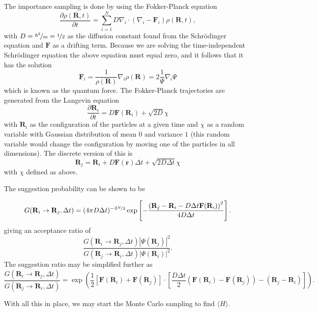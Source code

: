 \documentclass[aps,prb,twocolumn,floatfix]{revtex4}
\renewcommand{\vec}{\mathbf}
\begin{document}
The importance sampling is done by using the Fokker-Planck equation %
\begin{equation}
    \frac{\partial \rho (\vec R, t)}{\partial t} = \sum_{i=1}^{N} D \nabla_i \cdot (\nabla_i - \vec F_i) \rho(\vec R, t),
\end{equation}
with $D = \nicefrac{\hbar^2}{m} = \nicefrac{1}{2}$ as the diffusion constant found from the Schrödinger equation and $\vec F$ as a drifting term. Because we are solving the time-independent Schrödinger equation the above equation must equal zero, and it follows that it has the solution\cite{lecturenotes}
\begin{equation}
    \vec F_i = \frac{1}{\rho (\vec R)}\nabla_i \rho(\vec R) = 2\frac{1}{\Psi} \nabla_i \Psi
\end{equation}
which is known as the quantum force. The Fokker-Planck trajectories are generated from the Langevin equation
\begin{equation}
    \frac{\partial \vec R_i}{\partial t} = D\vec F(\vec R_i) + \sqrt{2D}\chi
\end{equation}
with $\vec R_i$ as the configuration of the particles at a given time and $\chi$ as a random variable with Gaussian distribution of mean 0 and variance $1$ (this random variable would change the configuration by moving one of the particles in all dimensions). The discrete version of this is
\begin{equation}
    \vec R_j = \vec R_i + D \vec F(\vec r) \Delta t + \sqrt{2D\Delta t} \chi
\end{equation}
with $\chi$ defined as above.

The suggestion probability can be shown to be
\begin{widetext}
    \begin{equation}
        G(\vec R_i \to \vec R_j, \Delta t) = (4\pi D \Delta t)^{-3 \nicefrac{N}{2}} \exp \left[ - \frac{\left(\vec R_j - \vec R_i - D \Delta t \vec F(\vec R_i) \right)^2}{4 D \Delta t} \right].
    \end{equation}
giving an acceptance ratio of
\begin{equation}
    \frac{G(\vec R_i \to \vec R_j, \Delta t) |\Psi(\vec R_j)|^2}{G(\vec R_j \to \vec R_i, \Delta t) |\Psi(\vec R_i)|^2}.
\end{equation}
The suggestion ratio may be simplified further as
\begin{equation}
    \frac{G(\vec R_i \to \vec R_j, \Delta t)}{G(\vec R_j \to \vec R_i, \Delta t)} = \exp \left ( \frac{1}{2} \left[ \vec F(\vec R_i) + \vec F(\vec R_j) \right] \cdot
    \left[ \frac{D \Delta t}{2} \left ( \vec F (\vec R_i) - \vec F( \vec R_j) \right) - (\vec R_j - \vec R_i) \right] \right).
\end{equation} 
\end{widetext}
With all this in place, we may start the Monte Carlo sampling to find $\langle H \rangle$.
\end{document}
